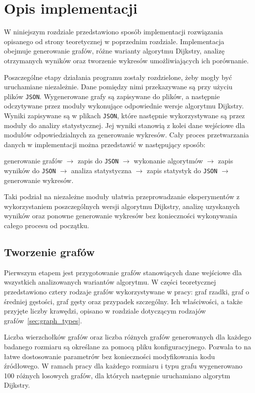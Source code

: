 \chapter{Opis implementacji}

W niniejszym rozdziale przedstawiono sposób implementacji rozwiązania opisanego od strony teoretycznej w poprzednim rozdziale. Implementacja obejmuje generowanie grafów, różne warianty algorytmu Dijkstry, analizę otrzymanych wyników oraz tworzenie wykresów umożliwiających ich porównanie.

Poszczególne etapy działania programu zostały rozdzielone, żeby mogły być uruchamiane niezależnie. Dane pomiędzy nimi przekazywane są przy użyciu plików \texttt{JSON}. Wygenerowane grafy są zapisywane do plików, a następnie odczytywane przez moduły wykonujące odpowiednie wersje algorytmu Dijkstry. Wyniki zapisywane są w plikach \texttt{JSON}, które następnie wykorzystywane są przez moduły do analizy statystycznej. Jej wyniki stanowią z kolei dane wejściowe dla modułów odpowiedzialnych za generowanie wykresów. Cały proces przetwarzania danych w implementacji można przedstawić w następujący sposób:
\begin{center}
    generowanie grafów
    $\rightarrow$
    zapis do \texttt{JSON}
    $\rightarrow$
    wykonanie algorytmów
    $\rightarrow$
    zapis wyników do \texttt{JSON}
    $\rightarrow$
    analiza statystyczna
    $\rightarrow$
    zapis statystyk do \texttt{JSON}
    $\rightarrow$
    generowanie wykresów.
\end{center}

Taki podział na niezależne moduły ułatwia przeprowadzanie eksperymentów z wykorzystaniem poszczególnych wersji algorytmu Dijkstry, analizę uzyskanych wyników oraz ponowne generowanie wykresów bez konieczności wykonywania całego procesu od początku.
\newpage

\section{Tworzenie grafów}

Pierwszym etapem jest przygotowanie grafów stanowiących dane wejściowe dla wszystkich analizowanych wariantów algorytmu. W części teoretycznej przedstawiono cztery rodzaje grafów wykorzystywane w pracy: graf rzadki, graf o średniej gęstości, graf gęsty oraz przypadek szczególny. Ich właściwości, a także przyjęte liczby krawędzi, opisano w rozdziale dotyczącym rodzajów grafów~\ref{sec:graph_types}.

Liczba wierzchołków grafów oraz liczba różnych grafów generowanych dla każdego badanego rozmiaru są określane za pomocą pliku konfiguracyjnego. Pozwala to na łatwe dostosowanie parametrów bez konieczności modyfikowania kodu źródłowego. W ramach pracy dla każdego rozmiaru i typu grafu wygenerowano 100 różnych losowych grafów, dla których następnie uruchamiano algorytm Dijkstry.

